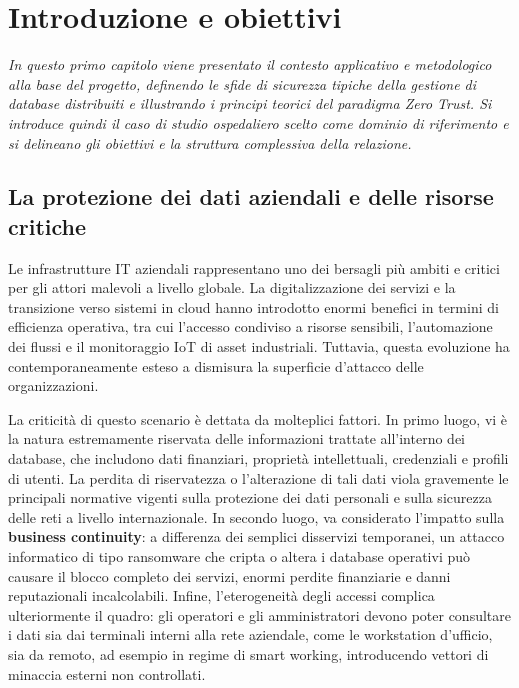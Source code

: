 \section{Introduzione e obiettivi}
\label{sec:introduzione}
\thispagestyle{plain}
{\itshape In questo primo capitolo viene presentato il contesto applicativo e metodologico alla base del progetto, definendo le sfide di sicurezza tipiche della gestione di database distribuiti e illustrando i principi teorici del paradigma Zero Trust. Si introduce quindi il caso di studio ospedaliero scelto come dominio di riferimento e si delineano gli obiettivi e la struttura complessiva della relazione.}

\subsection{La protezione dei dati aziendali e delle risorse critiche}
Le infrastrutture IT aziendali rappresentano uno dei bersagli più ambiti e critici per gli attori malevoli a livello globale. La digitalizzazione dei servizi e la transizione verso sistemi in cloud hanno introdotto enormi benefici in termini di efficienza operativa, tra cui l'accesso condiviso a risorse sensibili, l'automazione dei flussi e il monitoraggio IoT di asset industriali. Tuttavia, questa evoluzione ha contemporaneamente esteso a dismisura la superficie d'attacco delle organizzazioni.

La criticità di questo scenario è dettata da molteplici fattori. In primo luogo, vi è la natura estremamente riservata delle informazioni trattate all'interno dei database, che includono dati finanziari, proprietà intellettuali, credenziali e profili di utenti. La perdita di riservatezza o l'alterazione di tali dati viola gravemente le principali normative vigenti sulla protezione dei dati personali e sulla sicurezza delle reti a livello internazionale. In secondo luogo, va considerato l'impatto sulla \textbf{business continuity}: a differenza dei semplici disservizi temporanei, un attacco informatico di tipo ransomware che cripta o altera i database operativi può causare il blocco completo dei servizi, enormi perdite finanziarie e danni reputazionali incalcolabili. Infine, l'eterogeneità degli accessi complica ulteriormente il quadro: gli operatori e gli amministratori devono poter consultare i dati sia dai terminali interni alla rete aziendale, come le workstation d'ufficio, sia da remoto, ad esempio in regime di smart working, introducendo vettori di minaccia esterni non controllati.

